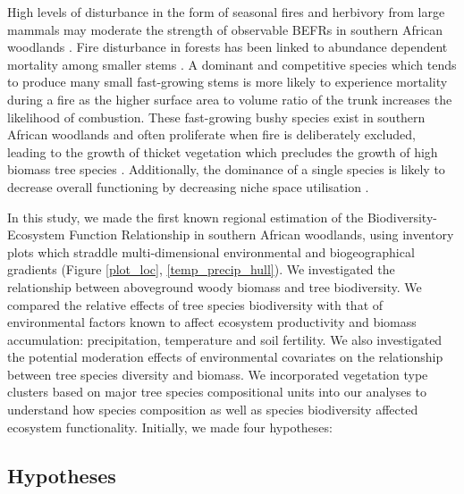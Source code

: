\documentclass[11pt,a4paper]{article}
\begin{document}
High levels of disturbance in the form of seasonal fires and herbivory from large mammals may moderate the strength of observable BEFRs in southern African woodlands \citep{Staver2009, Bond2005}. Fire disturbance in forests has been linked to abundance dependent mortality among smaller stems \citep{Roques2001}. A dominant and competitive species which tends to produce many small fast-growing stems is more likely to experience mortality during a fire as the higher surface area to volume ratio of the trunk increases the likelihood of combustion. These fast-growing bushy species exist in southern African woodlands and often proliferate when fire is deliberately excluded, leading to the growth of thicket vegetation which precludes the growth of high biomass tree species \citep{Higgins2007}. Additionally, the dominance of a single species is likely to decrease overall functioning by decreasing niche space utilisation \citep{Cardinale2002}.

In this study, we made the first known regional estimation of the Biodiversity-Ecosystem Function Relationship in southern African woodlands, using inventory plots which straddle multi-dimensional environmental and biogeographical gradients (Figure \autoref{plot_loc}, \autoref{temp_precip_hull}). We investigated the relationship between aboveground woody biomass and tree biodiversity. We compared the relative effects of tree species biodiversity with that of environmental factors known to affect ecosystem productivity and biomass accumulation: precipitation, temperature and soil fertility. We also investigated the potential moderation effects of environmental covariates on the relationship between tree species diversity and biomass. We incorporated vegetation type clusters based on major tree species compositional units into our analyses to understand how species composition as well as species biodiversity affected ecosystem functionality. Initially, we made four hypotheses: 

\subsection{Hypotheses}
\end{document}
